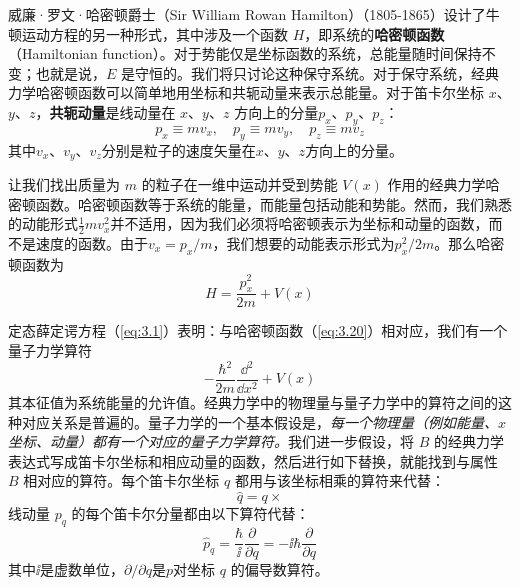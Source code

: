 	威廉·罗文·哈密顿爵士（Sir William Rowan Hamilton）（1805-1865）设计了牛顿运动方程的另一种形式，其中涉及一个函数 $H$，即系统的\textbf{哈密顿函数}（Hamiltonian function）。对于势能仅是坐标函数的系统，总能量随时间保持不变；也就是说，$E$ 是守恒的。我们将只讨论这种保守系统。对于保守系统，经典力学哈密顿函数可以简单地用坐标和共轭动量来表示总能量。对于笛卡尔坐标 $x$、$y$、$z$，\textbf{共轭动量}是线动量在 $x$、$y$、$z$ 方向上的分量$p_x$、$p_y$、$p_z$：
	\begin{equation}
		\boxed{
			p_x \equiv mv_x, \quad p_y \equiv mv_y, \quad p_z \equiv mv_z
		}
		\label{eq:3.19}
	\end{equation}
	其中$v_x$、$v_y$、$v_z$分别是粒子的速度矢量在$x$、$y$、$z$方向上的分量。

	让我们找出质量为 $m$ 的粒子在一维中运动并受到势能 $V\left(x\right)$ 作用的经典力学哈密顿函数。哈密顿函数等于系统的能量，而能量包括动能和势能。然而，我们熟悉的动能形式$\frac{1}{2}mv_x^2$并不适用，因为我们必须将哈密顿表示为坐标和动量的函数，而不是速度的函数。由于$v_x = p_x/m$，我们想要的动能表示形式为$p_x^2/2m$。那么哈密顿函数为
	\begin{equation}
		H = \frac{p_x^2}{2m}+V\left(x\right)
		\label{eq:3.20}
	\end{equation}

	定态薛定谔方程（\ref{eq:3.1}）表明：与哈密顿函数（\ref{eq:3.20}）相对应，我们有一个量子力学算符
	\begin{equation*}
		-\frac{\hbar^2}{2m}\frac{\dd ^2}{\dd x^2}+V\left(x\right)
	\end{equation*}
	其本征值为系统能量的允许值。经典力学中的物理量与量子力学中的算符之间的这种对应关系是普遍的。量子力学的一个基本假设是，\textit{每一个物理量（例如能量、$x$ 坐标、动量）都有一个对应的量子力学算符。}我们进一步假设，将 $B$ 的经典力学表达式写成笛卡尔坐标和相应动量的函数，然后进行如下替换，就能找到与属性 $B$ 相对应的算符。每个笛卡尔坐标 $q$ 都用与该坐标相乘的算符来代替：
	\begin{equation*}
		\hat{q} = q \times
	\end{equation*}
	线动量 $p_q$ 的每个笛卡尔分量都由以下算符代替：
	\begin{equation*}
		\hat{p}_q = \frac{\hbar}{\ii }\frac{\partial}{\partial q} = -\ii \hbar\frac{\partial}{\partial q}
	\end{equation*}	
	其中$\ii $是虚数单位，$\partial / \partial q$是$p$对坐标 $q$ 的偏导数算符。

